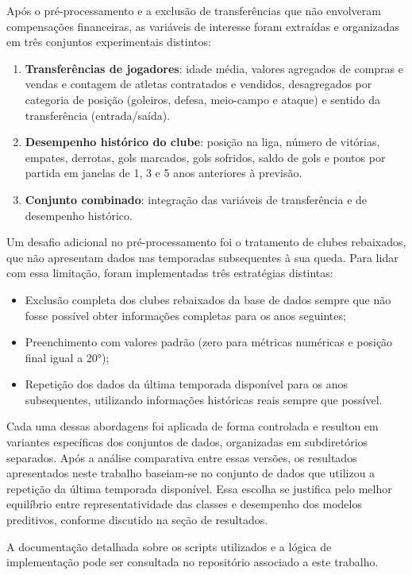 \documentclass[a4paper]{article}
\theoremstyle{plain}
\theoremstyle{definition}
\begin{document}
Após o pré-processamento e a exclusão de transferências que não envolveram compensações financeiras, as variáveis de interesse foram extraídas e organizadas em três conjuntos experimentais distintos:
\begin{enumerate}
\item \textbf{Transferências de jogadores}: idade média, valores agregados de compras e vendas e contagem de atletas contratados e vendidos, desagregados por categoria de posição (goleiros, defesa, meio-campo e ataque) e sentido da transferência (entrada/saída).
\item \textbf{Desempenho histórico do clube}: posição na liga, número de vitórias, empates, derrotas, gols marcados, gols sofridos, saldo de gols e pontos por partida em janelas de 1, 3 e 5 anos anteriores à previsão.
\item \textbf{Conjunto combinado}: integração das variáveis de transferência e de desempenho histórico.
\end{enumerate}

Um desafio adicional no pré-processamento foi o tratamento de clubes rebaixados, que não apresentam dados nas temporadas subsequentes à sua queda. Para lidar com essa limitação, foram implementadas três estratégias distintas: 
\begin{itemize}
    \item Exclusão completa dos clubes rebaixados da base de dados sempre que não fosse possível obter informações completas para os anos seguintes; 
    \item Preenchimento com valores padrão (zero para métricas numéricas e posição final igual a 20°); 
    \item Repetição dos dados da última temporada disponível para os anos subsequentes, utilizando informações históricas reais sempre que possível. 
\end{itemize}

Cada uma dessas abordagens foi aplicada de forma controlada e resultou em variantes específicas dos conjuntos de dados, organizadas em subdiretórios separados. Após a análise comparativa entre essas versões, os resultados apresentados neste trabalho baseiam-se no conjunto de dados que utilizou a repetição da última temporada disponível. Essa escolha se justifica pelo melhor equilíbrio entre representatividade das classes e desempenho dos modelos preditivos, conforme discutido na seção de resultados.

A documentação detalhada sobre os scripts utilizados e a lógica de implementação pode ser consultada no repositório associado a este trabalho. \\
\end{document}

